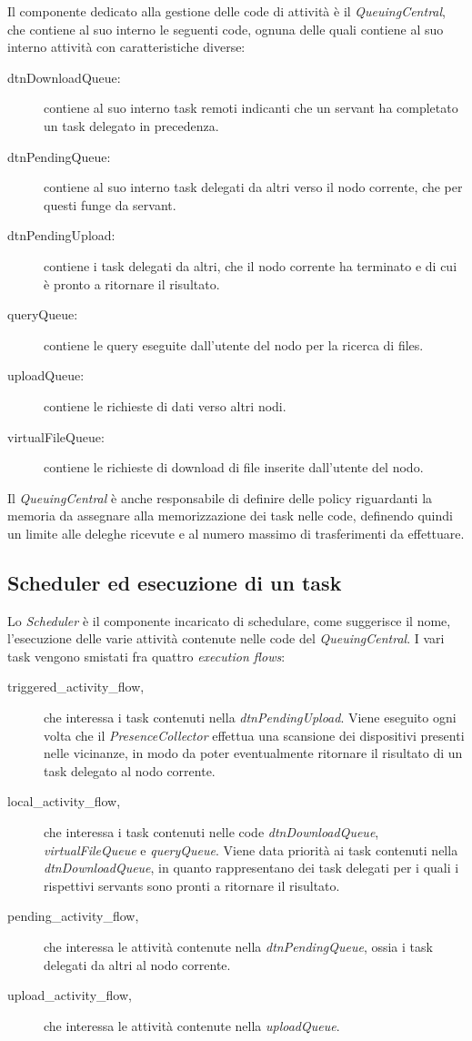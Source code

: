 Il componente dedicato alla gestione delle code di attività è il \textit{QueuingCentral}, che contiene al suo interno le seguenti code, ognuna delle quali contiene al suo interno attività con caratteristiche diverse:

\begin{description}
\item[dtnDownloadQueue:] contiene al suo interno task remoti indicanti che un servant ha completato un task delegato in precedenza.
\item[dtnPendingQueue:] contiene al suo interno task delegati da altri verso il nodo corrente, che per questi funge da servant.
\item[dtnPendingUpload:] contiene i task delegati da altri, che il nodo corrente ha terminato e di cui è pronto a ritornare il risultato.
\item[queryQueue:] contiene le query eseguite dall'utente del nodo per la ricerca di files.
\item[uploadQueue:] contiene le richieste di dati verso altri nodi.
\item[virtualFileQueue:] contiene le richieste di download di file inserite dall'utente del nodo.
\end{description}

Il \textit{QueuingCentral} è anche responsabile di definire delle policy riguardanti la memoria da assegnare alla memorizzazione dei task nelle code, definendo quindi un limite alle deleghe ricevute e al numero massimo di trasferimenti da effettuare.

\subsection{Scheduler ed esecuzione di un task}
Lo \textit{Scheduler} è il componente incaricato di schedulare, come suggerisce il nome, l'esecuzione delle varie attività contenute nelle code del \textit{QueuingCentral}. I vari task vengono smistati fra quattro \textit{execution flows}:

\begin{description}
\item[triggered\_activity\_flow,] che interessa i task contenuti nella \textit{dtnPendingUpload}. Viene eseguito ogni volta che il \textit{PresenceCollector} effettua una scansione dei dispositivi presenti nelle vicinanze, in modo da poter eventualmente ritornare il risultato di un task delegato al nodo corrente.
\item[local\_activity\_flow,] che interessa i task contenuti nelle code \textit{dtnDownloadQueue}, \textit{virtualFileQueue} e \textit{queryQueue}. Viene data priorità ai task contenuti nella \textit{dtnDownloadQueue}, in quanto rappresentano dei task delegati per i quali i rispettivi servants sono pronti a ritornare il risultato.
\item[pending\_activity\_flow,] che interessa le attività contenute nella \textit{dtnPendingQueue}, ossia i task delegati da altri al nodo corrente. 
\item[upload\_activity\_flow,] che interessa le attività contenute nella \textit{uploadQueue}.
\end{description}

